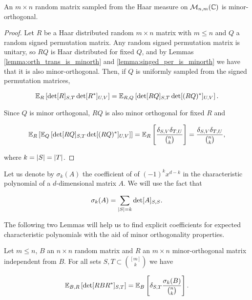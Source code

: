 \begin{corollary}
    An $m\times n$ random matrix sampled from the Haar measure on $\mathcal M_{n,m}(\mathbb C)$ is minor-orthogonal.
\end{corollary}

\begin{proof}
    Let $R$ be a Haar distributed random $m\times n$ matrix with $m \le n$ and $Q$ a random signed permutation matrix. Any random signed permutation matrix is unitary, so $RQ$ is Haar distributed for fixed $Q$, and by Lemmas \ref{lemma:orth_trans_is_minorth} and \ref{lemma:singed_per_is_minorth} we have that it is also minor-orthogonal. Then, if $Q$ is uniformly sampled from the signed permutation matrices,

    \begin{align*}
        \mathbb E_R\left[ \det[R]_{S,T}\det[R^*]_{U,V} \right] = \mathbb E_{R,Q}\left[ \det[RQ]_{S,T} \det[(RQ)^*]_{U,V}\right]. 
    \end{align*}

    Since $Q$ is minor orthogonal, $RQ$ is also minor orthogonal for fixed $R$ and 

    \begin{align*}
        \mathbb E_R\left[ \mathbb E_Q \left[ \det[RQ]_{S,T}\det[(RQ)^*]_{U,V} \right] \right] = \mathbb E_R\left[ \frac{\delta_{S,V}\delta_{T,U}}{\binom{n}{k}}\right] = \frac{\delta_{S,V}\delta_{T,U}}{\binom{n}{k}},
    \end{align*}

    \noindent where $k = \lvert S \rvert = \lvert T \rvert$. 
\end{proof}




Let us denote by $\sigma_k(A)$ the coefficient of of $(-1)^{k}x^{d-k}$ in the characteristic polynomial of a $d$-dimensional matrix $A$. We will use the fact that 

\begin{equation*}
    \sigma_k(A) = \sum_{\lvert S \rvert = k} \det[A]_{S,S}.
\end{equation*}

The following two Lemmas will help us to find explicit coefficients for expected characteristic polynomials with the aid of minor orthogonality properties.

\begin{lemma} \label{lemma:conjugate_minorth}
    Let $m \le n$, $B$ an $n\times n$ random matrix and $R$ an $m\times n$ minor-orthogonal matrix independent from $B$. For all sets $S,T \subset \binom{[m]}{k}$ we have

    \begin{equation*}
        \mathbb E_{B,R} \left[ \det[RBR^*]_{S,T} \right] = \mathbb E_B \left[\delta_{S,T} \frac{\sigma_k(B)}{\binom{n}k}\right].
    \end{equation*}
\end{lemma}

